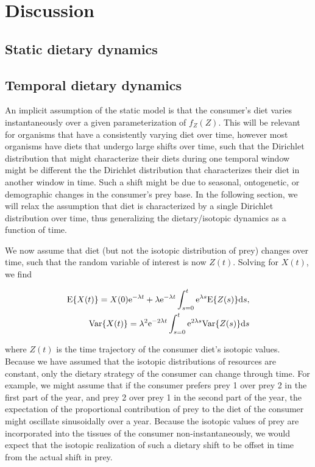 \documentclass[11pt]{article}
\begin{document}





\section{Discussion}

\subsection{Static dietary dynamics}



\subsection{Temporal dietary dynamics}
An implicit assumption of the static model is that the consumer's diet varies instantaneously over a given parameterization of $f_Z(Z)$.
This will be relevant for organisms that have a consistently varying diet over time, however most organisms have diets that undergo large shifts over time, such that the Dirichlet distribution that might characterize their diets during one temporal window might be different the the Dirichlet distribution that characterizes their diet in another window in time.
Such a shift might be due to seasonal, ontogenetic, or demographic changes in the consumer's prey base.
In the following section, we will relax the assumption that diet is characterized by a single Dirichlet distribution over time, thus generalizing the dietary/isotopic dynamics as a function of time.

We now assume that diet (but not the isotopic distribution of prey) changes over time, such that the random variable of interest is now $Z(t)$.
Solving for $X(t)$, we find

\begin{align}
{\rm E}\{X(t)\} = X(0){\rm e}^{-\lambda t} + \lambda{\rm e}^{-\lambda t} \int_{s=0}^t {\rm e}^{\lambda s} {\rm E}\{Z(s)\}{\rm d}s, \nonumber \\
{\rm Var}\{X(t)\} = \lambda^2 {\rm e}^{-2\lambda t} \int_{s=0}^t {\rm e}^{2\lambda s} {\rm Var}\{Z(s)\} {\rm d}s
\end{align}

\noindent where $Z(t)$ is the time trajectory of the consumer diet's isotopic values.
Because we have assumed that the isotopic distributions of resources are constant, only the dietary strategy of the consumer can change through time.
For example, we might assume that if the consumer prefers prey 1 over prey 2 in the first part of the year, and prey 2 over prey 1 in the second part of the year, the expectation of the proportional contribution of prey to the diet of the consumer might oscillate sinusoidally over a year.
Because the isotopic values of prey are incorporated into the tissues of the consumer non-instantaneously, we would expect that the isotopic realization of such a dietary shift to be offset in time from the actual shift in prey.
\end{document}
